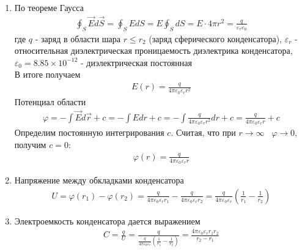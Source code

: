 \documentclass[__main__.tex]{subfiles}
\begin{document}
	\begin{enumerate}
		\item По теореме Гаусса
			\begin{gather*}
				\oint_S\vec{E}d\vec{S} = \oint_SEdS = E\oint_SdS = E\cdot 4\pi r^2 = \frac{q}{\varepsilon_r \varepsilon_0}
			\end{gather*}
			где $q$ - заряд в области шара $r \leq r_2$ (заряд сферического конденсатора), $\varepsilon_r$ - относительная диэлектрическая проницаемость диэлектрика конденсатора, $\varepsilon_0 = 8.85\times 10^{-12}$ - диэлектрическая постоянная\\
			В итоге получаем 
			\begin{gather*}
				E(r) = \frac{q}{4\pi \varepsilon_0 \varepsilon_r r^2}
			\end{gather*}  
			Потенциал области
			\begin{gather*}
				\varphi = -\int\vec{E}d\vec{r}+c = -\int Edr +c = -\int \frac{q}{4\pi \varepsilon_0 \varepsilon_r r^2} dr +c = \frac{q}{4\pi \varepsilon_0 \varepsilon_r r}+c
			\end{gather*}
			Определим постоянную интегрирования $c$. Считая, что при $r \to \infty\;\;\; \varphi \to 0$, получим $c = 0$:
			\begin{gather*}
				\varphi (r) = \frac{q}{4\pi \varepsilon_0 \varepsilon_r r}
			\end{gather*} 
		\item Напряжение между обкладками конденсатора
			\begin{gather*}
				U = \varphi (r_1) - \varphi (r_2) = \frac{q}{4\pi \varepsilon_0 \varepsilon_r r_1} - \frac{q}{4\pi \varepsilon_0 \varepsilon_r r_2} = \frac{q}{4\pi \varepsilon_0 \varepsilon_r}\left(\frac{1}{r_1}-\frac{1}{r_2}\right)
			\end{gather*}
		\item Электроемкость конденсатора дается выражением
			\begin{gather*}
				C = \frac{q}{U} = \frac{q}{\frac{q}{4\pi \varepsilon_0 \varepsilon_r}\left(\frac{1}{r_1}-\frac{1}{r_2}\right)} = \frac{4\pi \varepsilon_0 \varepsilon_r r_1 r_2}{r_2-r_1}
			\end{gather*}
	\end{enumerate}	
\end{document}
